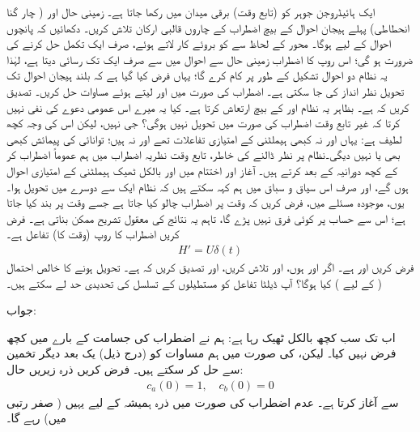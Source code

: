 ایک ہائیڈروجن جوہر کو (تابع وقت) برقی میدان  میں رکھا جاتا ہے۔ زمینی حال  اور ( چار گنا انحطاطی) پہلے ہیجان احوال  کے بیچ اضطراب  کے چاروں قالبی ارکان  تلاش کریں۔ دکھائیں کہ پانچوں احوال کے لیے  ہوگا۔  محور  کے لحاظ سے  کو بروئے کار لاتے ہوئے، صرف ایک تکمل حل کرنے کی ضرورت ہو گی؛ اس روپ کا اضطراب زمینی حال سے  احوال میں سے صرف ایک تک رسائی دیتا ہے، لہٰذا یہ نظام دو احوال تشکیل کے طور پر کام کرے گا؛ یہاں فرض کیا گیا ہے کہ بلند ہیجان احوال تک تحویل نظر انداز کی جا سکتی ہے۔
 اضطراب کی صورت میں  اور  لیتے ہوئے مساوات  حل کریں۔ تصدیق کریں کہ  ہے۔  بظاہر یہ نظام  اور  کے بیچ ارتعاش کرتا ہے۔ کیا یہ میرے اس عمومی دعوے کی نفی نہیں کرتا کہ غیر تابع وقت اضطراب کی صورت میں تحویل نہیں ہوگی؟ جی نہیں، لیکن اس کی وجہ کچھ لطیف ہے: یہاں  اور  نہ کبھی ہیملٹنی کے امتیازی تفاعلات تھے اور نہ ہیں؛ توانائی کی پیمائش کبھی بھی  یا  نہیں دیگی۔نظام پر نظر ڈالنے کی خاطر، تابع وقت نظریہ اضطراب میں ہم عموماً اضطراب  کر کے کچھ دورانیہ کے بعد  کرتے ہیں۔ آغاز اور اختتام میں  اور  بالکل ٹھیک ہیملٹنی کے امتیازی احوال ہوں گے، اور صرف اس سیاق و سباق میں ہم کہہ سکتے ہیں کہ نظام ایک سے دوسرے میں تحویل ہوا۔ یوں، موجودہ مسئلے میں، فرض کریں کہ وقت  پر اضطراب چالو کیا جاتا ہے جسے وقت  پر بند کیا جاتا ہے؛ اس سے حساب پر کوئی فرق نہیں پڑے گا، تاہم یہ نتائج کی معقول تشریح ممکن بناتی ہے۔
فرض کریں اضطراب کا روپ (وقت کا)  تفاعل ہے۔
\begin{align*}
	H'=U\delta(t) 
\end{align*}
فرض کریں  اور  ہے۔ اگر  اور  ہوں،  اور  تلاش کریں، اور تصدیق کریں کہ  ہے۔ تحویل ہونے کا خالص احتمال (  کے لیے ) کیا ہوگا؟  آپ ڈیلٹا تفاعل کو مستطیلوں کے تسلسل کی تحدیدی حد لے سکتے ہیں۔

جواب:  


اب تک سب کچھ بالکل ٹھیک رہا ہے: ہم نے اضطراب کی جسامت کے بارے میں کچھ فرض نہیں کیا۔ لیکن،   کی صورت میں ہم مساوات  کو (درج ذیل) یک بعد دیگر تخمین سے حل کر سکتے ہیں۔ فرض کریں ذرہ زیریں حال:
\begin{align}
	c_a(0)=1,\quad c_b(0)=0
\end{align}
سے آغاز کرتا ہے۔ عدم اضطراب کی صورت میں ذرہ ہمیشہ کے لیے یہیں ( صفر رتبی میں) رہے گا۔


